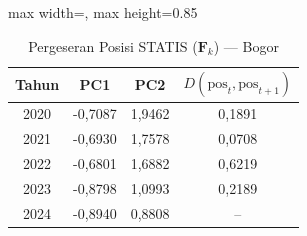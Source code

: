 \begin{table}[H]
\centering
\caption{Pergeseran Posisi STATIS ($\mathbf{F}_k$) --- Bogor} \label{tab:app2jarak_statis_skor_bogor}
\begin{adjustbox}{max width=\textwidth, max height=0.85\textheight}
\begin{tabular}{|c|c|c|c|}
\hline
\textbf{Tahun} & \textbf{PC1} & \textbf{PC2} & \textbf{$D(\text{pos}_t, \text{pos}_{t+1})$} \\
\hline
2020 & -0,7087 & 1,9462 & 0,1891 \\
2021 & -0,6930 & 1,7578 & 0,0708 \\
2022 & -0,6801 & 1,6882 & 0,6219 \\
2023 & -0,8798 & 1,0993 & 0,2189 \\
2024 & -0,8940 & 0,8808 & -- \\
\hline
\end{tabular}
\end{adjustbox}
\end{table}